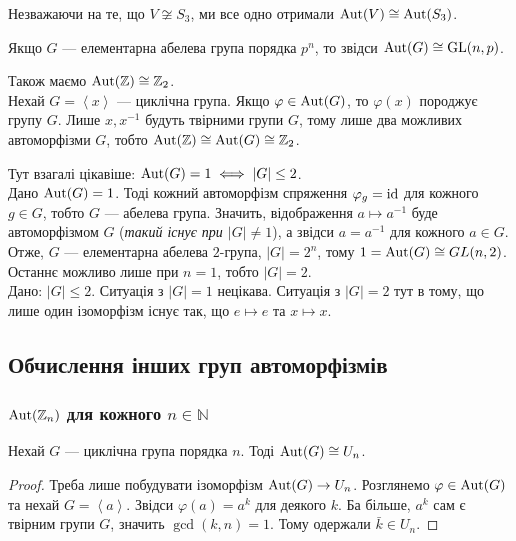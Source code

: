 \documentclass{math_library}
\begin{document}
\begin{remark}
Незважаючи на те, що $V \not\cong S_3$, ми все одно отримали $\operatorname{Aut}(V) \cong \operatorname{Aut}(S_3)$.
\end{remark}

\begin{example}
Якщо $G$ --- елементарна абелева група порядка $p^n$, то звідси $\operatorname{Aut}(G) \cong \operatorname{GL}(n,p)$.
\end{example}

\begin{example}
Також маємо $\operatorname{Aut}(\mathbb{Z}) \cong \mathbb{Z}_2$.
\bigskip \\
Нехай $G = \left<x\right>$ --- циклічна група. Якщо $\varphi \in \operatorname{Aut}(G)$, то $\varphi(x)$ породжує групу $G$. Лише $x,x^{-1}$ будуть твірними групи $G$, тому лише два можливих автоморфізми $G$, тобто $\operatorname{Aut}(\mathbb{Z}) \cong \operatorname{Aut}(G) \cong \mathbb{Z}_2$.
\end{example}

\begin{example}
Тут взагалі цікавіше: $\operatorname{Aut}(G) = 1 \iff |G| \leq 2$.
\bigskip \\
\rightproof Дано $\operatorname{Aut}(G) = 1$. Тоді кожний автоморфізм спряження $\varphi_g = \operatorname{id}$ для кожного $g \in G$, тобто $G$ --- абелева група. Значить, відображення $a \mapsto a^{-1}$ буде автоморфізмом $G$ (\textit{такий існує при $|G| \neq 1$}), а звідси $a = a^{-1}$ для кожного $a \in G$. Отже, $G$ --- елементарна абелева $2$-група, $|G| = 2^n$, тому $1 = \operatorname{Aut}(G) \cong GL(n,2)$. Останнє можливо лише при $n = 1$, тобто $|G| = 2$.
\bigskip \\
\leftproof Дано: $|G| \leq 2$. Ситуація з $|G| = 1$ нецікава. Ситуація з $|G| = 2$ тут в тому, що лише один ізоморфізм існує так, що $e \mapsto e$ та $x \mapsto x$.
\end{example}

\subsection{Обчислення інших груп автоморфізмів}
\subsubsection{$\operatorname{Aut}(\mathbb{Z}_n)$ для кожного $n \in \mathbb{N}$}
\begin{lemma}
Нехай $G$ --- циклічна група порядка $n$. Тоді $\operatorname{Aut}(G) \cong U_n$.
\end{lemma}

\begin{proof}
Треба лише побудувати ізоморфізм $\operatorname{Aut}(G) \to U_n$. Розглянемо $\varphi \in \operatorname{Aut}(G)$ та нехай $G = \left<a\right>$. Звідси $\varphi(a) = a^k$ для деякого $k$. Ба більше, $a^k$ сам є твірним групи $G$, значить $\gcd(k,n) = 1$. Тому одержали $\bar{k} \in U_n$.
\end{proof}
\end{document}
